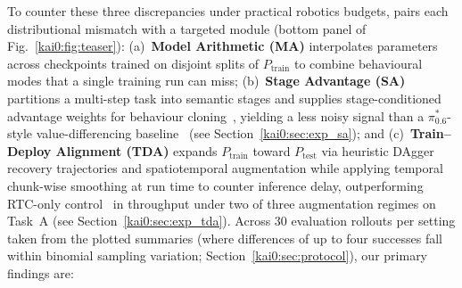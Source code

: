 To counter these three discrepancies under practical robotics budgets, \chiz pairs each distributional mismatch with a targeted module (bottom panel of Fig.~\ref{kai0:fig:teaser}): (a)~\textbf{Model Arithmetic (MA)} interpolates parameters across checkpoints trained on disjoint splits of $P_{\mathrm{train}}$ to combine behavioural modes that a single training run can miss; (b)~\textbf{Stage Advantage (SA)} partitions a multi-step task into semantic stages and supplies stage-conditioned advantage weights for behaviour cloning~\cite{peng2019awr}, yielding a less noisy signal than a $\pi^{*}_{0.6}$-style value-differencing baseline~\cite{amin2026pistar06} (see Section~\ref{kai0:sec:exp_sa}); and (c)~\textbf{Train--Deploy Alignment (TDA)} expands $P_{\mathrm{train}}$ toward $P_{\mathrm{test}}$ via heuristic DAgger recovery trajectories and spatiotemporal augmentation while applying temporal chunk-wise smoothing at run time to counter inference delay, outperforming RTC-only control~\cite{black2025rtc} in throughput under two of three augmentation regimes on Task~A (see Section~\ref{kai0:sec:exp_tda}). Across 30 evaluation rollouts per setting taken from the plotted summaries (where differences of up to four successes fall within binomial sampling variation; Section~\ref{kai0:sec:protocol}), our primary findings are:
